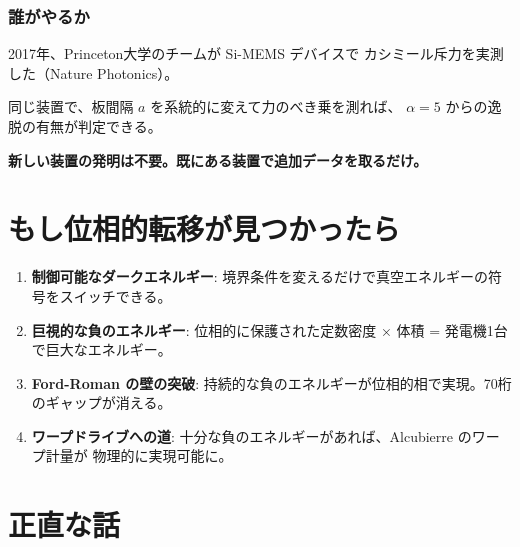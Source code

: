 \documentclass[12pt,a4paper]{article}
\begin{document}
\section{誰がやるか}

\begin{storybox}[Princeton 大学]
2017年、Princeton大学のチームが Si-MEMS デバイスで
カシミール斥力を実測した（Nature Photonics）。

同じ装置で、板間隔 $a$ を系統的に変えて力のべき乗を測れば、
$\alpha = 5$ からの逸脱の有無が判定できる。

\textbf{新しい装置の発明は不要。既にある装置で追加データを取るだけ。}
\end{storybox}

\part{もし位相的転移が見つかったら}

\begin{resultbox}[4つの帰結]
\begin{enumerate}
\item \textbf{制御可能なダークエネルギー}:
境界条件を変えるだけで真空エネルギーの符号をスイッチできる。

\item \textbf{巨視的な負のエネルギー}:
位相的に保護された定数密度 × 体積 = 発電機1台で巨大なエネルギー。

\item \textbf{Ford-Roman の壁の突破}:
持続的な負のエネルギーが位相的相で実現。70桁のギャップが消える。

\item \textbf{ワープドライブへの道}:
十分な負のエネルギーがあれば、Alcubierre のワープ計量が
物理的に実現可能に。
\end{enumerate}
\end{resultbox}

\part{正直な話}
\end{document}
